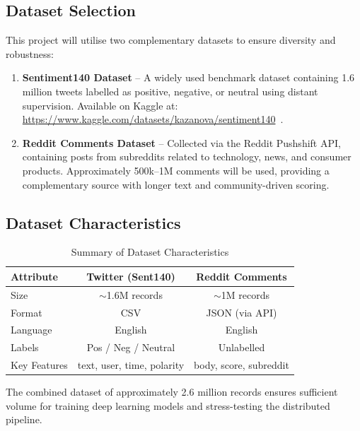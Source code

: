 \documentclass[conference]{IEEEtran}
\begin{document}
\subsection{Dataset Selection}
This project will utilise two complementary datasets to ensure diversity and robustness:

\begin{enumerate}[leftmargin=*]
    \item \textbf{Sentiment140 Dataset} -- A widely used benchmark dataset containing 1.6 million tweets labelled as positive, negative, or neutral using distant supervision. Available on Kaggle at: \url{https://www.kaggle.com/datasets/kazanova/sentiment140}~\cite{go2009twitter}.
    \item \textbf{Reddit Comments Dataset} -- Collected via the Reddit Pushshift API, containing posts from subreddits related to technology, news, and consumer products. Approximately 500k--1M comments will be used, providing a complementary source with longer text and community-driven scoring.
\end{enumerate}

\subsection{Dataset Characteristics}

\begin{table}[H]
\centering
\caption{Summary of Dataset Characteristics}
\label{tab:dataset}
\renewcommand{\arraystretch}{1.15}
\begin{tabular}{@{}lcc@{}}
\toprule
\textbf{Attribute} & \textbf{Twitter (Sent140)} & \textbf{Reddit Comments} \\
\midrule
Size & $\sim$1.6M records & $\sim$1M records \\
Format & CSV & JSON (via API) \\
Language & English & English \\
Labels & Pos / Neg / Neutral & Unlabelled \\
Key Features & text, user, time, polarity & body, score, subreddit \\
\bottomrule
\end{tabular}
\end{table}

The combined dataset of approximately 2.6 million records ensures sufficient volume for training deep learning models and stress-testing the distributed pipeline.
\end{document}
